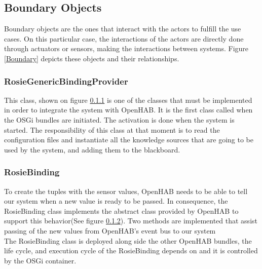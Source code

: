 \subsection{Boundary Objects}


Boundary objects are the ones that interact with the actors to fulfill the use cases\cite{Bruegge2004}. On this particular case, the interactions of the actors are directly done through actuators or sensors, making the interactions between systems. Figure \ref{Boundary} depicts these objects and their relationships.

\subsubsection{RosieGenericBindingProvider}
\label{RosieGenericBindingProvider}


This class, shown on figure \ref{RosieGenericBindingProvider} is one of the classes that must be implemented in order to integrate the system with OpenHAB. It is the first class called when the OSGi bundles are initiated.
The activation is done when the system is started. The responsibility of this class at that moment is to read the configuration files and instantiate all the knowledge sources that are going to be used by the system, and adding them to the blackboard.

\subsubsection{RosieBinding}
\label{RosieBinding}

To create the tuples with the sensor values, OpenHAB needs to be able to tell our system when a new value is ready to be passed. In consequence, the RosieBinding class implements the abstract class provided by OpenHAB to support this behavior(See figure \ref{RosieBinding}). Two methods are implemented that assist passing of the new values from OpenHAB's event bus to our system\\
The RosieBinding class is deployed along side the other OpenHAB bundles, the life cycle, and execution cycle of the RosieBinding depends on and it is controlled by the OSGi container.

